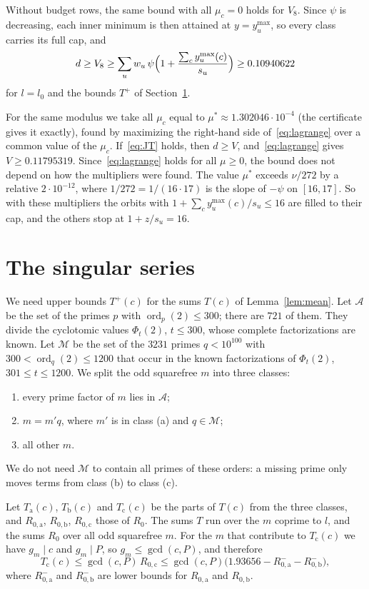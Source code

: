 \documentclass[11pt]{amsart}
\theoremstyle{definition}
\theoremstyle{remark}
\numberwithin{equation}{section}
\newcommand{\ord}{\operatorname{ord}}
\newcommand{\Dweakfloor}{0.10940622}%
\newcommand{\Dcwfloor}{0.11795319}%
\newcommand{\NprimesA}{721}
\newcommand{\NprimesB}{3231}
\begin{document}
Without budget rows, the same bound with all $\mu_c=0$ holds for $V_8$. Since $\psi$ is decreasing, each inner minimum is then attained at $y=y^{\max}_u$, so every class carries its full cap, and
\[
d\ge V_8\ge\sum_uw_u\,\psi\Bigl(1+\frac{\sum_cy^{\max}_u(c)}{s_u}\Bigr)\ge\Dweakfloor
\]
for $l=l_0$ and the bounds $T^+$ of Section~\ref{sec:series}.

For the same modulus we take all $\mu_c$ equal to $\mu^*\approx1.302046\cdot10^{-4}$ (the certificate gives it exactly), found by maximizing the right-hand side of~\eqref{eq:lagrange} over a common value of the $\mu_c$. If~\eqref{eq:JT} holds, then $d\ge V$, and~\eqref{eq:lagrange} gives $V\ge\Dcwfloor$. Since~\eqref{eq:lagrange} holds for all $\mu\ge0$, the bound does not depend on how the multipliers were found. The value $\mu^*$ exceeds $\nu/272$ by a relative $2\cdot10^{-12}$, where $1/272=1/(16\cdot17)$ is the slope of $-\psi$ on $[16,17]$. So with these multipliers the orbits with $1+\sum_cy_u^{\max}(c)/s_u\le16$ are filled to their cap, and the others stop at $1+z/s_u=16$.

\section{The singular series}\label{sec:series}

We need upper bounds $T^+(c)$ for the sums $T(c)$ of Lemma~\ref{lem:mean}. Let $\mathcal A$ be the set of the primes $p$ with $\ord_p(2)\le300$; there are $\NprimesA$ of them. They divide the cyclotomic values $\Phi_t(2)$, $t\le300$, whose complete factorizations are known. Let $\mathcal M$ be the set of the $\NprimesB$ primes $q<10^{100}$ with $300<\ord_q(2)\le1200$ that occur in the known factorizations of $\Phi_t(2)$, $301\le t\le1200$. We split the odd squarefree $m$ into three classes:
\begin{enumerate}[label=(\alph*)]
\item every prime factor of $m$ lies in $\mathcal A$;
\item $m=m'q$, where $m'$ is in class (a) and $q\in\mathcal M$;
\item all other $m$.
\end{enumerate}
We do not need $\mathcal M$ to contain all primes of these orders: a missing prime only moves terms from class (b) to class (c).

Let $T_{\mathrm a}(c)$, $T_{\mathrm b}(c)$ and $T_{\mathrm c}(c)$ be the parts of $T(c)$ from the three classes, and $R_{0,\mathrm a}$, $R_{0,\mathrm b}$, $R_{0,\mathrm c}$ those of $R_0$. The sums $T$ run over the $m$ coprime to $l$, and the sums $R_0$ over all odd squarefree $m$. For the $m$ that contribute to $T_{\mathrm c}(c)$ we have $g_m\mid c$ and $g_m\mid P$, so $g_m\le\gcd(c,P)$, and therefore
\[
T_{\mathrm c}(c)\le\gcd(c,P)\,R_{0,\mathrm c}\le\gcd(c,P)\bigl(1.93656-R_{0,\mathrm a}^--R_{0,\mathrm b}^-\bigr),
\]
where $R_{0,\mathrm a}^-$ and $R_{0,\mathrm b}^-$ are lower bounds for $R_{0,\mathrm a}$ and $R_{0,\mathrm b}$.
\end{document}
